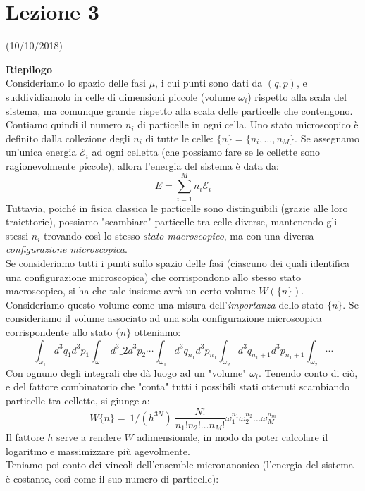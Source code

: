 \documentclass[12pt]{article}
\begin{document}
\section{Lezione 3}
\vspace{-1em}
\begin{center}
    \small{(10/10/2018)}
\end{center}
\textbf{Riepilogo}\\ %
Consideriamo lo spazio delle fasi $\mu$, i cui punti sono dati da \((q,p)\), e suddividiamolo in celle di dimensioni piccole (volume $\omega_i$) rispetto alla scala del sistema, ma comunque grande rispetto alla scala delle particelle che contengono.\\
Contiamo quindi il numero $n_i$ di particelle in ogni cella. Uno stato microscopico è definito dalla collezione degli $n_i$ di tutte le celle: $\{n\}=\{n_i, \dots, n_M\}$. Se assegnamo un'unica energia $\mathcal{E}_i$ ad ogni celletta (che possiamo fare se le cellette sono ragionevolmente piccole), allora l'energia del sistema è data da:
\[
E = \sum_{i=1}^M n_i\mathcal{E}_i
\]
Tuttavia, poiché in fisica classica le particelle sono distinguibili (grazie alle loro traiettorie), possiamo "scambiare" particelle tra celle diverse, mantenendo gli stessi $n_i$ trovando così lo stesso \textit{stato macroscopico}, ma con una diversa \textit{configurazione microscopica}.\\
Se consideriamo tutti i punti sullo spazio delle fasi (ciascuno dei quali identifica una configurazione microscopica) che corrispondono allo stesso stato macroscopico, si ha che tale insieme avrà un certo volume $W(\{n\})$. Consideriamo questo volume come una misura dell'\textit{importanza} dello stato $\{n\}$. Se consideriamo il volume associato ad una sola configurazione microscopica corrispondente allo stato $\{n\}$ otteniamo:
\[
\int_{\omega_1} d^3 q_1 d^3p_1 \int_{\omega_1} d^3\_2 d^3p_2 \cdots \int_{\omega_1}d^3 q_{n_1}d^3p_{n_1} \int_{\omega_2}d^3 q_{n_1+1}d^3 p_{n_1+1} \int_{\omega_2}\cdots
\]
Con ognuno degli integrali che dà luogo ad un "volume" $\omega_i$. Tenendo conto di ciò, e del fattore combinatorio che "conta" tutti i possibili stati ottenuti scambiando particelle tra cellette, si giunge a:
\[
W\{n\} =\ 1/(h^{3N})\ \frac{N!}{n_1! n_2! \dots n_M!} \omega_1^{n_1} \omega_2^{n_2} \dots \omega_M^{n_m}
\]
Il fattore $h$ serve a rendere $W$ adimensionale, in modo da poter calcolare il logaritmo e massimizzare più agevolmente.\\
Teniamo poi conto dei vincoli dell'ensemble micronanonico (l'energia del sistema è costante, così come il suo numero di particelle):
\end{document}
